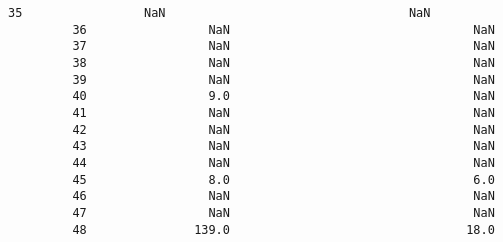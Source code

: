 \documentclass[11pt]{article}
\begin{document}
\begin{Verbatim}[commandchars=\\\{\}]
         35                 NaN                                  NaN   
         36                 NaN                                  NaN   
         37                 NaN                                  NaN   
         38                 NaN                                  NaN   
         39                 NaN                                  NaN   
         40                 9.0                                  NaN   
         41                 NaN                                  NaN   
         42                 NaN                                  NaN   
         43                 NaN                                  NaN   
         44                 NaN                                  NaN   
         45                 8.0                                  6.0   
         46                 NaN                                  NaN   
         47                 NaN                                  NaN   
         48               139.0                                 18.0   
         

\end{Verbatim}
\end{document}
